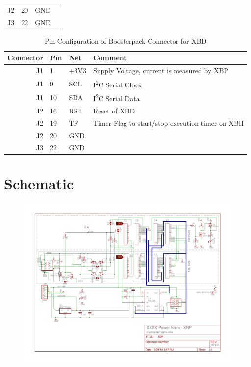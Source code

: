 \documentclass[twoside,11pt]{cergdoc}
\newcommand{\ITwoC}{I\textsuperscript{2}C }
\begin{document}
\begin{appendix}
\begin{table}[ht]
\begin{center}
\begin{tabular}{rlll}
       J2 & 20 & GND       & \\
       J3 & 22 & GND       & \\ \hline
    \end{tabular}
  \end{center}
\end{table}
\begin{table}[ht]
  \begin{center}
    \caption{Pin Configuration of Boosterpack Connector for XBD}
    \begin{tabular}{rlll}
      Connector & Pin  & Net         & Comment  \\ \hline
       J1 & 1  & +3V3      & Supply Voltage, current is measured by XBP \\
       J1 & 9  & SCL       & \ITwoC Serial Clock  \\
       J1 & 10 & SDA       & \ITwoC Serial Data \\
       J2 & 16 & RST       & Reset of XBD \\ 
       J2 & 19 & TF        & Timer Flag to start/stop execution timer on XBH \\
       J2 & 20 & GND       & \\
       J3 & 22 & GND       & \\ \hline
    \end{tabular}
  \end{center}
\end{table}

\chapter{Schematic}\label{sec:schematic}

\begin{figure}[ht]
    \vspace{-1.6cm}
    \hspace{-1.2cm}\includegraphics[scale=0.88, angle=90]{figures/XBP-schematic}
\end{figure}


\end{appendix}
\end{document}
